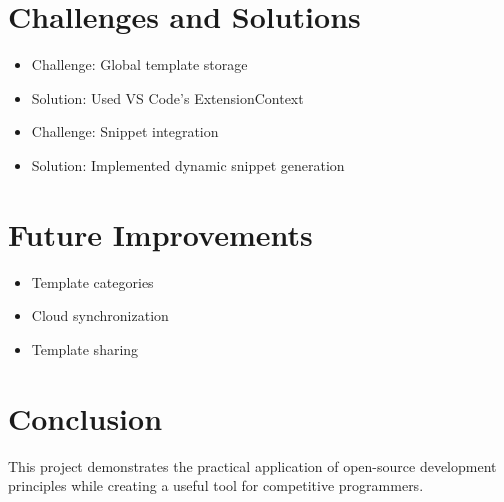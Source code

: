 \documentclass{article}
\begin{document}
\section{Challenges and Solutions}
\begin{itemize}
    \item Challenge: Global template storage
    \item Solution: Used VS Code's ExtensionContext
    \item Challenge: Snippet integration
    \item Solution: Implemented dynamic snippet generation
\end{itemize}

\section{Future Improvements}
\begin{itemize}
    \item Template categories
    \item Cloud synchronization
    \item Template sharing
\end{itemize}

\section{Conclusion}
This project demonstrates the practical application of open-source development principles while creating a useful tool for competitive programmers.
\end{document}
